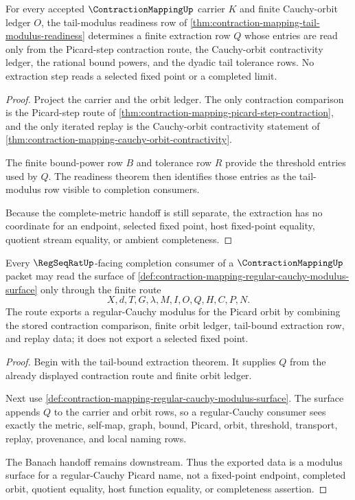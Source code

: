 \begin{theorem}
\label{thm:contraction-mapping-tail-bound-extraction}
For every accepted $\ContractionMappingUp$ carrier $K$ and finite Cauchy-orbit ledger $O$, the tail-modulus readiness row of \autoref{thm:contraction-mapping-tail-modulus-readiness} determines a finite extraction row $Q$ whose entries are read only from the Picard-step contraction route, the Cauchy-orbit contractivity ledger, the rational bound powers, and the dyadic tail tolerance rows. No extraction step reads a selected fixed point or a completed limit.
\end{theorem}
\begin{proof}
Project the carrier and the orbit ledger. The only contraction comparison is the Picard-step route of \autoref{thm:contraction-mapping-picard-step-contraction}, and the only iterated replay is the Cauchy-orbit contractivity statement of \autoref{thm:contraction-mapping-cauchy-orbit-contractivity}.

The finite bound-power row $B$ and tolerance row $R$ provide the threshold entries used by $Q$. The readiness theorem then identifies those entries as the tail-modulus row visible to completion consumers.

Because the complete-metric handoff is still separate, the extraction has no coordinate for an endpoint, selected fixed point, host fixed-point equality, quotient stream equality, or ambient completeness.
\end{proof}

\begin{theorem}
\label{thm:contraction-mapping-regular-cauchy-modulus-export}
Every $\RegSeqRatUp$-facing completion consumer of a $\ContractionMappingUp$ packet may read the surface of \autoref{def:contraction-mapping-regular-cauchy-modulus-surface} only through the finite route
$$
X,d,T,G,\lambda,M,I,O,Q,H,C,P,N.
$$
The route exports a regular-Cauchy modulus for the Picard orbit by combining the stored contraction comparison, finite orbit ledger, tail-bound extraction row, and replay data; it does not export a selected fixed point.
\end{theorem}
\begin{proof}
Begin with the tail-bound extraction theorem. It supplies $Q$ from the already displayed contraction route and finite orbit ledger.

Next use \autoref{def:contraction-mapping-regular-cauchy-modulus-surface}. The surface appends $Q$ to the carrier and orbit rows, so a regular-Cauchy consumer sees exactly the metric, self-map, graph, bound, Picard, orbit, threshold, transport, replay, provenance, and local naming rows.

The Banach handoff remains downstream. Thus the exported data is a modulus surface for a regular-Cauchy Picard name, not a fixed-point endpoint, completed orbit, quotient equality, host function equality, or completeness assertion.
\end{proof}

